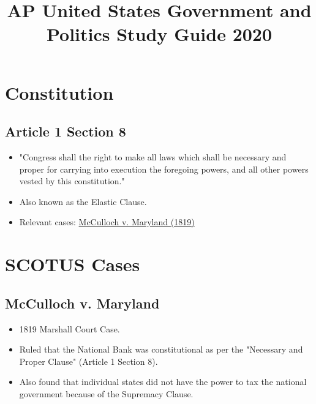 \documentclass[12pt]{article}
\title{AP United States Government and Politics Study Guide 2020}
\begin{document}
\maketitle
\section{Constitution}
\subsection{Article 1 Section 8}
\begin{itemize}
	\item "Congress shall the right to make all laws which shall be necessary and proper for carrying into execution the foregoing powers, and all other powers vested by this constitution."
	\item Also known as the Elastic Clause.
	\item Relevant cases: \hyperlink{McCulloch}{McCulloch v. Maryland (1819)}
\end{itemize}
\section{SCOTUS Cases}
\hypertarget{McCulloch}{\subsection{McCulloch v. Maryland}}
	\begin{itemize}
	\item 1819 Marshall Court Case.
	\item Ruled that the National Bank was constitutional as per the "Necessary and Proper Clause" (Article 1 Section 8).
	\item Also found that individual states did not have the power to tax the national government because of the Supremacy Clause.
	\end{itemize}
\end{document}
